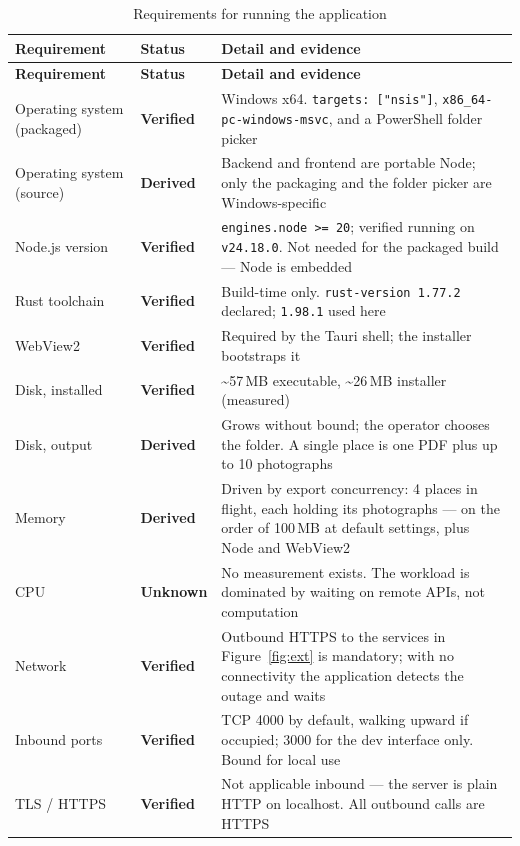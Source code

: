 \documentclass[11pt,a4paper]{report}
\newcommand{\code}[1]{\texttt{\small #1}}
\newcommand{\ver}[1]{\texttt{#1}}
\newcommand{\lblV}{\textcolor{cBack}{\textbf{Verified}}}
\newcommand{\lblD}{\textcolor{cFront}{\textbf{Derived}}}
\newcommand{\lblU}{\textcolor{cNote}{\textbf{Unknown}}}
\begin{document}
\begin{longtable}{@{}>{\raggedright\arraybackslash}p{3.1cm}>{\raggedright\arraybackslash}p{2.6cm}>{\raggedright\arraybackslash}p{9.0cm}@{}}
\caption{Requirements for running the application}\label{tab:hosting}\\
\toprule
\textbf{Requirement} & \textbf{Status} & \textbf{Detail and evidence}\\
\midrule
\endfirsthead
\toprule
\textbf{Requirement} & \textbf{Status} & \textbf{Detail and evidence}\\
\midrule
\endhead
\bottomrule
\endfoot
Operating system (packaged) & \lblV & Windows x64. \code{targets: ["nsis"]}, \code{x86\_64-pc-windows-msvc}, and a PowerShell folder picker\\
Operating system (source)   & \lblD & Backend and frontend are portable Node; only the packaging and the folder picker are Windows-specific\\
Node.js version             & \lblV & \code{engines.node >= 20}; verified running on \ver{v24.18.0}. Not needed for the packaged build --- Node is embedded\\
Rust toolchain              & \lblV & Build-time only. \code{rust-version 1.77.2} declared; \ver{1.98.1} used here\\
WebView2                    & \lblV & Required by the Tauri shell; the installer bootstraps it\\
Disk, installed             & \lblV & \textasciitilde 57\,MB executable, \textasciitilde 26\,MB installer (measured)\\
Disk, output                & \lblD & Grows without bound; the operator chooses the folder. A single place is one PDF plus up to 10 photographs\\
Memory                      & \lblD & Driven by export concurrency: 4 places in flight, each holding its photographs --- on the order of 100\,MB at default settings, plus Node and WebView2\\
CPU                         & \lblU & No measurement exists. The workload is dominated by waiting on remote APIs, not computation\\
Network                     & \lblV & Outbound HTTPS to the services in Figure~\ref{fig:ext} is mandatory; with no connectivity the application detects the outage and waits\\
Inbound ports               & \lblV & TCP 4000 by default, walking upward if occupied; 3000 for the dev interface only. Bound for local use\\
TLS / HTTPS                 & \lblV & Not applicable inbound --- the server is plain HTTP on localhost. All outbound calls are HTTPS\\

\end{longtable}
\end{document}
